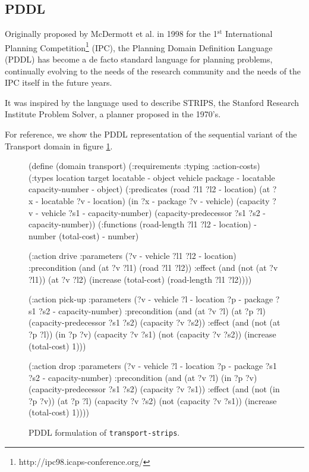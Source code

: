 \subsection{PDDL}

Originally proposed by McDermott et al. in 1998 for the 1$^{\mathrm{st}}$ International Planning
Competition\footnote{http://ipc98.icaps-conference.org/} (IPC),
the Planning Domain Definition Language\cite{McDermott1998} (PDDL) has become
a de facto standard language for planning problems, continually evolving to the needs of the
research community and the needs of the IPC itself in the future years.

It was inspired by the language used to describe STRIPS,
the Stanford Research Institute Problem Solver\cite{Fikes1971},
a planner proposed in the 1970's. 

For reference, we show the PDDL representation of the sequential variant of
the Transport domain in figure \ref{code:pddl-strips}.

\begin{figure}[htb]
\begin{code}
(define (domain transport)
  (:requirements :typing :action-costs)
  (:types
        location target locatable - object
        vehicle package - locatable
        capacity-number - object)
  (:predicates 
     (road ?l1 ?l2 - location)
     (at ?x - locatable ?v - location)
     (in ?x - package ?v - vehicle)
     (capacity ?v - vehicle ?s1 - capacity-number)
     (capacity-predecessor ?s1 ?s2 - capacity-number))
  (:functions
     (road-length ?l1 ?l2 - location) - number
     (total-cost) - number)
     
  (:action drive
    :parameters (?v - vehicle ?l1 ?l2 - location)
    :precondition (and (at ?v ?l1) (road ?l1 ?l2))
    :effect (and (not (at ?v ?l1)) (at ?v ?l2)
        (increase (total-cost) (road-length ?l1 ?l2))))
        
 (:action pick-up
    :parameters (?v - vehicle ?l - location ?p - package
                 ?s1 ?s2 - capacity-number)
    :precondition (and (at ?v ?l) (at ?p ?l)
        (capacity-predecessor ?s1 ?s2) (capacity ?v ?s2))
    :effect (and (not (at ?p ?l)) (in ?p ?v) (capacity ?v ?s1)
        (not (capacity ?v ?s2)) (increase (total-cost) 1)))
        
  (:action drop
    :parameters (?v - vehicle ?l - location ?p - package
                 ?s1 ?s2 - capacity-number)
    :precondition (and (at ?v ?l) (in ?p ?v)
        (capacity-predecessor ?s1 ?s2) (capacity ?v ?s1))
    :effect (and (not (in ?p ?v)) (at ?p ?l) (capacity ?v ?s2)
        (not (capacity ?v ?s1)) (increase (total-cost) 1))))
\end{code}
\caption{PDDL formulation of \texttt{transport-strips}.}
\label{code:pddl-strips}
\end{figure}





